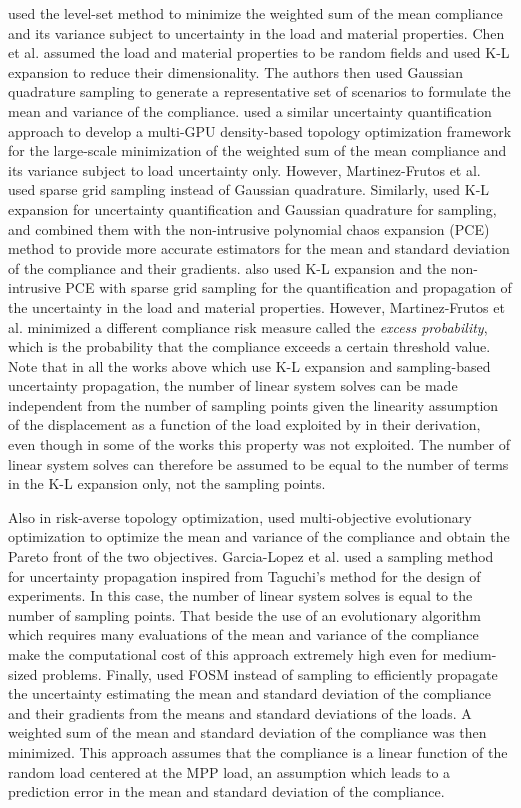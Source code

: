     \cite{Chen2010} used the level-set method to minimize the weighted sum of the mean compliance and its variance subject to uncertainty in the load and material properties. Chen et al. assumed the load and material properties to be random fields and used K-L expansion to reduce their dimensionality. The authors then used Gaussian quadrature sampling to generate a representative set of scenarios to formulate the mean and variance of the compliance. \cite{Martinez-Frutos2016} used a similar uncertainty quantification approach to develop a multi-GPU density-based topology optimization framework for the large-scale minimization of the weighted sum of the mean compliance and its variance subject to load uncertainty only. However, Martinez-Frutos et al. used sparse grid sampling instead of Gaussian quadrature. Similarly, \cite{Cuellar2018} used K-L expansion for uncertainty quantification and Gaussian quadrature for sampling, and combined them with the non-intrusive polynomial chaos expansion (PCE) method to provide more accurate estimators for the mean and standard deviation of the compliance and their gradients. \cite{Martinez-Frutos2018} also used K-L expansion and the non-intrusive PCE with sparse grid sampling for the quantification and propagation of the uncertainty in the load and material properties. However, Martinez-Frutos et al. minimized a different compliance risk measure called the \textit{excess probability}, which is the probability that the compliance exceeds a certain threshold value. Note that in all the works above which use K-L expansion and sampling-based uncertainty propagation, the number of linear system solves can be made independent from the number of sampling points given the linearity assumption of the displacement as a function of the load exploited by \cite{Zhao2014b} in their derivation, even though in some of the works this property was not exploited. The number of linear system solves can therefore be assumed to be equal to the number of terms in the K-L expansion only, not the sampling points. 

    Also in risk-averse topology optimization, \cite{Garcia-Lopez2013} used multi-objective evolutionary optimization to optimize the mean and variance of the compliance and obtain the Pareto front of the two objectives. Garcia-Lopez et al. used a sampling method for uncertainty propagation inspired from Taguchi's method for the design of experiments. In this case, the number of linear system solves is equal to the number of sampling points. That beside the use of an evolutionary algorithm which requires many evaluations of the mean and variance of the compliance make the computational cost of this approach extremely high even for medium-sized problems. Finally, \cite{Kriegesmann2019} used FOSM instead of sampling to efficiently propagate the uncertainty estimating the mean and standard deviation of the compliance and their gradients from the means and standard deviations of the loads. A weighted sum of the mean and standard deviation of the compliance was then minimized. This approach assumes that the compliance is a linear function of the random load centered at the MPP load, an assumption which leads to a prediction error in the mean and standard deviation of the compliance. 

